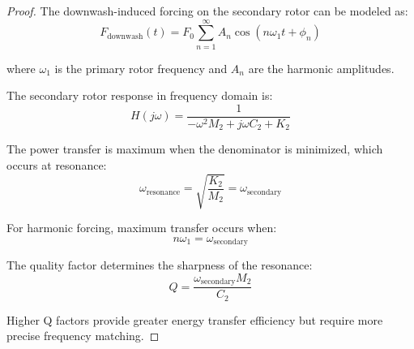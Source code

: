 \documentclass{article}
\begin{document}
\begin{proof}
The downwash-induced forcing on the secondary rotor can be modeled as:
\begin{equation}
F_{\text{downwash}}(t) = F_0 \sum_{n=1}^{\infty} A_n \cos(n\omega_1 t + \phi_n)
\end{equation}

where $\omega_1$ is the primary rotor frequency and $A_n$ are the harmonic amplitudes.

The secondary rotor response in frequency domain is:
\begin{equation}
H(j\omega) = \frac{1}{-\omega^2 M_2 + j\omega C_2 + K_2}
\end{equation}

The power transfer is maximum when the denominator is minimized, which occurs at resonance:
$$\omega_{\text{resonance}} = \sqrt{\frac{K_2}{M_2}} = \omega_{\text{secondary}}$$

For harmonic forcing, maximum transfer occurs when:
$$n\omega_1 = \omega_{\text{secondary}}$$

The quality factor determines the sharpness of the resonance:
\begin{equation}
Q = \frac{\omega_{\text{secondary}} M_2}{C_2}
\end{equation}

Higher Q factors provide greater energy transfer efficiency but require more precise frequency matching.
\end{proof}
\end{document}
